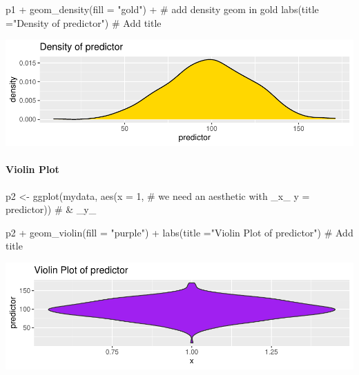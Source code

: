 \documentclass[12pt,]{article}
\newenvironment{Shaded}{}{}
\newcommand{\CommentTok}[1]{\textcolor[rgb]{0.00,0.50,0.00}{#1}}
\newcommand{\DataTypeTok}[1]{#1}
\newcommand{\DecValTok}[1]{#1}
\newcommand{\KeywordTok}[1]{\textcolor[rgb]{0.00,0.00,1.00}{#1}}
\newcommand{\NormalTok}[1]{#1}
\newcommand{\OperatorTok}[1]{#1}
\newcommand{\StringTok}[1]{\textcolor[rgb]{0.00,0.50,0.50}{#1}}
\let\oldparagraph\paragraph
\renewcommand{\paragraph}[1]{\oldparagraph{#1}\mbox{}}
\begin{document}
\begin{Shaded}
\begin{Highlighting}[]
\NormalTok{p1 }\OperatorTok{+}\StringTok{ }\KeywordTok{geom_density}\NormalTok{(}\DataTypeTok{fill =} \StringTok{"gold"}\NormalTok{) }\OperatorTok{+}\StringTok{ }\CommentTok{# add density geom in gold}
\StringTok{  }\KeywordTok{labs}\NormalTok{(}\DataTypeTok{title =}\StringTok{"Density of predictor"}\NormalTok{) }\CommentTok{# Add title}
\end{Highlighting}
\end{Shaded}

\includegraphics{introduction-to-ggplot2_files/figure-latex/unnamed-chunk-10-1.pdf}

\hypertarget{violin-plot}{%
\paragraph{Violin Plot}\label{violin-plot}}

\begin{Shaded}
\begin{Highlighting}[]
\NormalTok{p2 <-}\StringTok{ }\KeywordTok{ggplot}\NormalTok{(mydata, }
             \KeywordTok{aes}\NormalTok{(}\DataTypeTok{x =} \DecValTok{1}\NormalTok{, }\CommentTok{# we need an aesthetic with _x_}
                 \DataTypeTok{y =}\NormalTok{ predictor)) }\CommentTok{# & _y_}

\NormalTok{p2 }\OperatorTok{+}\StringTok{ }\KeywordTok{geom_violin}\NormalTok{(}\DataTypeTok{fill =} \StringTok{"purple"}\NormalTok{) }\OperatorTok{+}
\StringTok{  }\KeywordTok{labs}\NormalTok{(}\DataTypeTok{title =}\StringTok{"Violin Plot of predictor"}\NormalTok{) }\CommentTok{# Add title}
\end{Highlighting}
\end{Shaded}

\includegraphics{introduction-to-ggplot2_files/figure-latex/unnamed-chunk-11-1.pdf}
\end{document}
